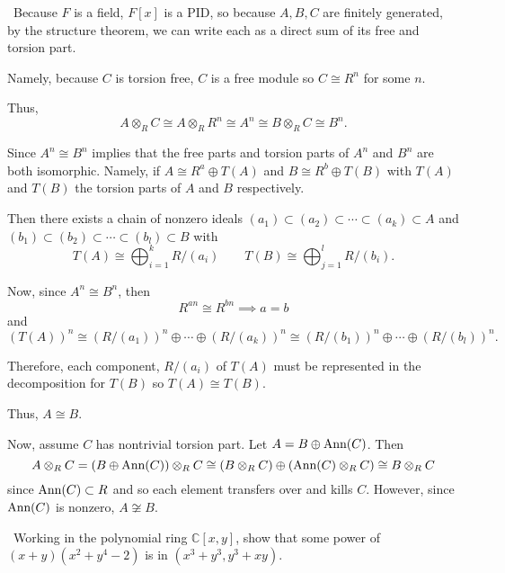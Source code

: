 \documentclass[12pt]{AlgebraQual}
\begin{document}
\begin{solution}$\,$
Because $F$ is a field, $F[x]$ is a PID, so because $A,B,C$ are finitely generated, by the structure theorem, we can write each as a direct sum of its free and torsion part.

Namely, because $C$ is torsion free, $C$ is a free module so $C\cong R^n$ for some $n$.

Thus, $$A\otimes_RC\cong A\otimes_RR^n\cong A^n\cong B\otimes_RC\cong B^n.$$

Since $A^n\cong B^n$ implies that the free parts and torsion parts of $A^n$ and $B^n$ are both isomorphic. Namely, if $A\cong R^a\oplus T(A)$ and $B\cong R^b\oplus T(B)$ with $T(A)$ and $T(B)$ the torsion parts of $A$ and $B$ respectively.

Then there exists a chain of nonzero ideals $(a_1) \subset (a_2) \subset \cdots \subset(a_k)\subset A$ and $(b_1)\subset (b_2)\subset\cdots\subset (b_l)\subset B$ with $$T(A)\cong \bigoplus_{i=1}^kR/(a_i)\qquad T(B)\cong\bigoplus_{j=1}^lR/(b_i).$$

Now, since $A^n\cong B^n$, then $$R^{an}\cong R^{bn}\implies a=b$$ and $$(T(A))^n\cong (R/(a_1))^n\oplus\cdots\oplus (R/(a_k))^n\cong (R/(b_1))^n\oplus\cdots\oplus (R/(b_l))^n.$$

Therefore, each component, $R/(a_i)$ of $T(A)$ must be represented in the decomposition for $T(B)$ so $T(A)\cong T(B)$.

Thus, $A\cong B$.

Now, assume $C$ has nontrivial torsion part. Let $A=B\oplus \text{Ann}(C)$. Then $$A\otimes_RC=(B\oplus\text{Ann}(C))\otimes_RC\cong (B\otimes_RC)\oplus(\text{Ann}(C)\otimes_RC)\cong B\otimes_RC$$ since $\text{Ann}(C)\subset R$ and so each element transfers over and kills $C.$ However, since $\text{Ann}(C)$ is nonzero, $A\not\cong B.$
\end{solution}
\newpage



\begin{problem} $\,$
Working in the polynomial ring $\mathbb{C}[x,y]$, show that some power of $(x+y)(x^2+y^4-2)$ is in $(x^3+y^3,y^3+xy)$.
\end{problem}
\end{document}
